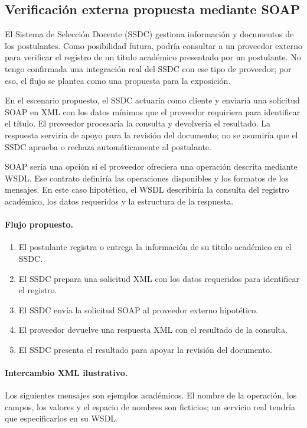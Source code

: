 \subsection{Verificación externa propuesta mediante SOAP}

El Sistema de Selección Docente (SSDC) gestiona información y documentos de
los postulantes. Como posibilidad futura, podría consultar a un proveedor
externo para verificar el registro de un título académico presentado por un
postulante. No tengo confirmada una integración real del SSDC con ese tipo de
proveedor; por eso, el flujo se plantea como una propuesta para la exposición.

En el escenario propuesto, el SSDC actuaría como cliente y enviaría una
solicitud SOAP en XML con los datos mínimos que el proveedor requiriera para
identificar el título. El proveedor procesaría la consulta y devolvería el
resultado. La respuesta serviría de apoyo para la revisión del documento; no
se asumiría que el SSDC aprueba o rechaza automáticamente al postulante.

SOAP sería una opción si el proveedor ofreciera una operación descrita
mediante WSDL. Ese contrato definiría las operaciones disponibles y los
formatos de los mensajes. En este caso hipotético, el WSDL describiría la
consulta del registro académico, los datos requeridos y la estructura de la
respuesta.

\paragraph{Flujo propuesto.}
\begin{enumerate}
    \item El postulante registra o entrega la información de su título
          académico en el SSDC.
    \item El SSDC prepara una solicitud XML con los datos requeridos para
          identificar el registro.
    \item El SSDC envía la solicitud SOAP al proveedor externo hipotético.
    \item El proveedor devuelve una respuesta XML con el resultado de la
          consulta.
    \item El SSDC presenta el resultado para apoyar la revisión del documento.
\end{enumerate}

\paragraph{Intercambio XML ilustrativo.}
Los siguientes mensajes son ejemplos académicos. El nombre de la operación,
los campos, los valores y el espacio de nombres son ficticios; un servicio
real tendría que especificarlos en su WSDL.

